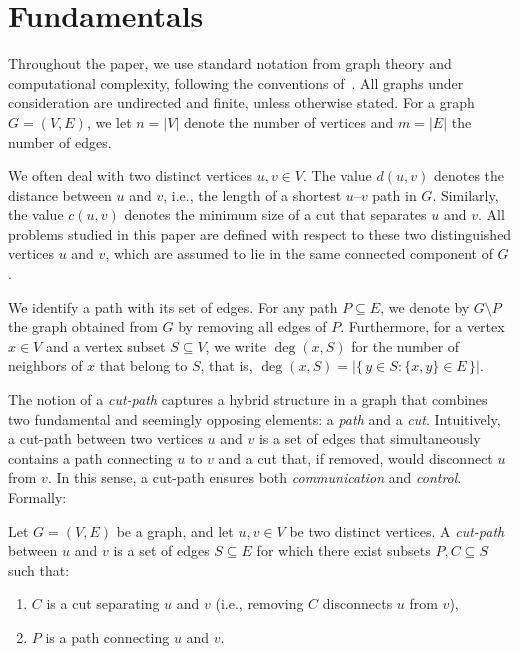 \section{Fundamentals}
\label{sec:fundamentals}

Throughout the paper, we use standard notation from graph theory and computational complexity, following the conventions of~\cite{Diestel2025,Cormen2022}.
All graphs under consideration are undirected and finite, unless otherwise stated.
For a graph $G = (V, E)$, we let $n = |V|$ denote the number of vertices and $m = |E|$ the number of edges.

We often deal with two distinct vertices $u, v \in V$.
The value $d(u, v)$ denotes the distance between $u$ and $v$, i.e., the length of a shortest $u$--$v$ path in $G$.
Similarly, the value $c(u, v)$ denotes the minimum size of a cut that separates $u$ and $v$.
All problems studied in this paper are defined with respect to these two distinguished vertices $u$ and $v$, which are assumed to lie in the same connected component of $G$.

We identify a path with its set of edges.
For any path $P \subseteq E$, we denote by $G \setminus P$ the graph obtained from $G$ by removing all edges of $P$.
Furthermore, for a vertex $x \in V$ and a vertex subset $S \subseteq V$, we write $\deg(x, S)$ for the number of neighbors of $x$ that belong to $S$, that is, $\deg(x, S) = |\{\,y \in S : \{x, y\} \in E\,\}|$.


The notion of a \emph{cut-path} captures a hybrid structure in a graph that combines two fundamental and seemingly opposing elements: a \emph{path} and a \emph{cut}.
Intuitively, a cut-path between two vertices $u$ and $v$ is a set of edges that simultaneously contains a path connecting $u$ to $v$ and a cut that, if removed, would disconnect $u$ from $v$.
In this sense, a cut-path ensures both \emph{communication} and \emph{control}.
Formally:

\begin{definition}
\label{def:cut-path}
Let $G = (V, E)$ be a graph, and let $u, v \in V$ be two distinct vertices.
A \emph{cut-path} between $u$ and $v$ is a set of edges $S \subseteq E$ for which there exist subsets $P, C \subseteq S$ such that:
    \begin{enumerate}
        \item $C$ is a cut separating $u$ and $v$ (i.e., removing $C$ disconnects $u$ from $v$),
        \item $P$ is a path connecting $u$ and $v$.
    \end{enumerate}
\end{definition}

